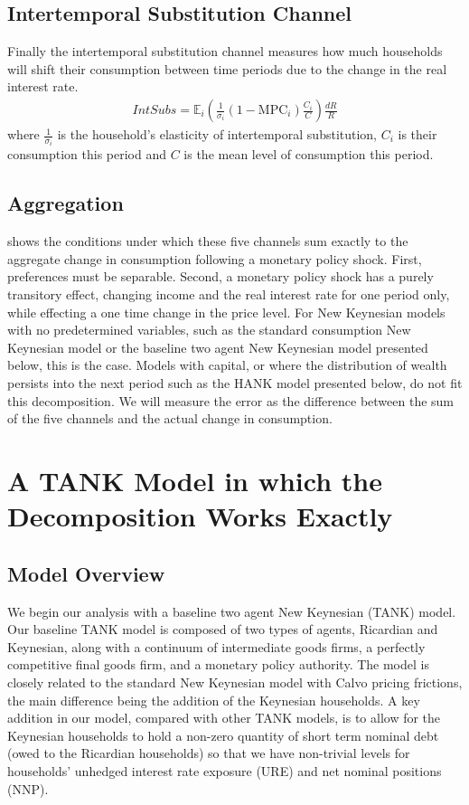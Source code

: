 \documentclass[titlepage]{\econtex}\newcommand{\texname}{ConsumptionHeterogeneity}
\begin{document}
\subsection{Intertemporal Substitution Channel}
Finally the intertemporal substitution channel measures how much households will shift their consumption between time periods due to the change in the real interest rate.
\begin{align}
\textit{IntSubs} = \mathbb{E}_i \left( \frac{1}{\sigma_i} (1-\text{MPC}_i) \frac{C_i}{C}  \right) \frac{dR}{R}
\end{align}
where $\frac{1}{\sigma_i}$ is the household's elasticity of intertemporal substitution, $C_i$ is their consumption this period and $C$ is the mean level of consumption this period.

\subsection{Aggregation}
\cite{auclert_monetary_2017} shows the conditions under which these five channels sum exactly to the aggregate change in consumption following a monetary policy shock. First, preferences must be separable. Second, a monetary policy shock has a purely transitory effect, changing income and the real interest rate for one period only, while effecting a one time change in the price level. For New Keynesian models with no predetermined variables, such as the standard consumption New Keynesian model or the baseline two agent New Keynesian model presented below, this is the case. Models with capital, or where the distribution of wealth persists into the next period such as the HANK model presented below, do not fit this decomposition. We will measure the error as the difference between the sum of the five channels and the actual change in consumption.


\section{A TANK Model in which the Decomposition Works Exactly}

\subsection{Model Overview}
We begin our analysis with a baseline two agent New Keynesian (TANK) model. Our baseline TANK model is composed of two types of agents, Ricardian and Keynesian, along with a continuum of intermediate goods firms, a perfectly competitive final goods firm, and a monetary policy authority. The model is closely related to the standard New Keynesian model with Calvo pricing frictions, the main difference being the addition of the Keynesian households. A key addition in our model, compared with other TANK models, is to allow for the Keynesian households to hold a non-zero quantity of short term nominal debt (owed to the Ricardian households) so that we have non-trivial levels for households' unhedged interest rate exposure (URE) and net nominal positions (NNP).
\end{document}
